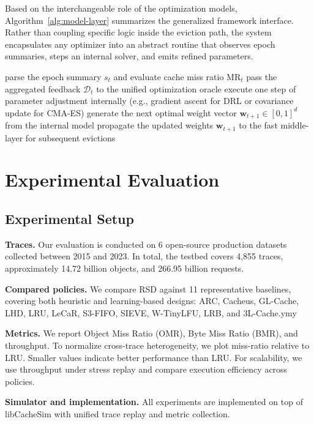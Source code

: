 \documentclass[10pt,journal]{IEEEtran}
\theoremstyle{slantedlemma}
\begin{document}
Based on the interchangeable role of the optimization models, Algorithm~\ref{alg:model-layer} summarizes the generalized framework interface. Rather than coupling specific logic inside the eviction path, the system encapsulates any optimizer into an abstract routine that observes epoch summaries, steps an internal solver, and emits refined parameters.
\begin{algorithm}[t]
\caption{Generalized model-layer process.}
\label{alg:model-layer}
\SetAlgoLined
parse the epoch summary $s_t$ and evaluate cache miss ratio $\mathrm{MR}_t$\;
pass the aggregated feedback $\mathcal{D}_t$ to the unified optimization oracle\;
execute one step of parameter adjustment internally (e.g., gradient ascent for DRL or covariance update for CMA-ES)\;
generate the next optimal weight vector $\mathbf{w}_{t+1} \in [0,1]^d$ from the internal model\;
propagate the updated weights $\mathbf{w}_{t+1}$ to the fast middle-layer for subsequent evictions\;
\end{algorithm}

\section{Experimental Evaluation}\label{sec: performance}

\subsection{Experimental Setup}
\textbf{Traces.}
Our evaluation is conducted on 6 open-source production datasets collected between 2015 and 2023.
In total, the testbed covers 4,855 traces, approximately 14.72 billion objects, and 266.95 billion requests.

\textbf{Compared policies.}
We compare RSD against 11 representative baselines, covering both heuristic and learning-based designs:
ARC, Cacheus, GL-Cache, LHD, LRU, LeCaR, S3-FIFO, SIEVE, W-TinyLFU, LRB, and 3L-Cache.ymy

\textbf{Metrics.}
We report Object Miss Ratio (OMR), Byte Miss Ratio (BMR), and throughput.
To normalize cross-trace heterogeneity, we plot miss-ratio relative to LRU.
Smaller values indicate better performance than LRU.
For scalability, we use throughput under stress replay and compare execution efficiency across policies.

\textbf{Simulator and implementation.}
All experiments are implemented on top of libCacheSim with unified trace replay and metric collection.
\end{document}
